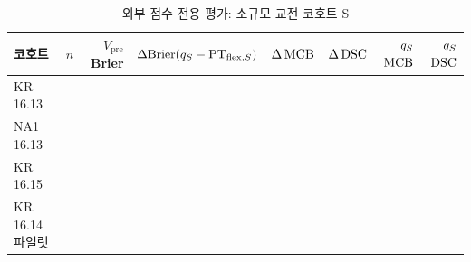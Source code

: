 \begin{table}[!t]
  \centering
  \caption{외부 점수 전용 평가: 소규모 교전 코호트 S}
  \label{tab:ext-S}
  \small
  \begin{tabular}{@{}lrrrrrrr@{}}
    \toprule
    코호트 & $n$ & $V_{\mathrm{pre}}$ Brier & $\Delta\mathrm{Brier}(q_{S} - \mathrm{PT}_{\mathrm{flex},S})$ & $\Delta\operatorname{MCB}$ & $\Delta\operatorname{DSC}$ & $q_{S}$ $\operatorname{MCB}$ & $q_{S}$ $\operatorname{DSC}$ \\
    \midrule
    KR 16.13 & \numSExtKR{} & \extSKRVpre{} & \textbf{\extSKRdBrier{}} & \extSKRdMCB{} & \extSKRdDSC{} & \extSKRqMCB{} & \extSKRqDSC{} \\
    NA1 16.13 & \numSExtNA{} & \extSNAVpre{} & \textbf{\extSNAdBrier{}} & \extSNAdMCB{} & \extSNAdDSC{} & \extSNAqMCB{} & \extSNAqDSC{} \\
    KR 16.15 & \numSExtKRb{} & \extSKRbVpre{} & \extSKRbdBrier{} & \extSKRbdMCB{} & \extSKRbdDSC{} & \extSKRbqMCB{} & \extSKRbqDSC{} \\
    KR 16.14 파일럿 & \numSExtPilot{} & \extSPilotVpre{} & \extSPilotdBrier{} & \extSPilotdMCB{} & \extSPilotdDSC{} & \extSPilotqMCB{} & \extSPilotqDSC{} \\
    \bottomrule
  \end{tabular}
\end{table}
